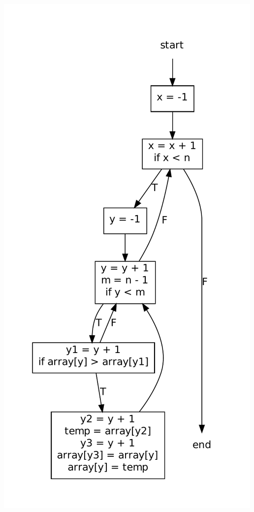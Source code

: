 \documentclass[english,a4paper]{scrartcl}
\begin{document}
\subsubsection{}
\includegraphics{flowgraph.pdf}
\end{document}
